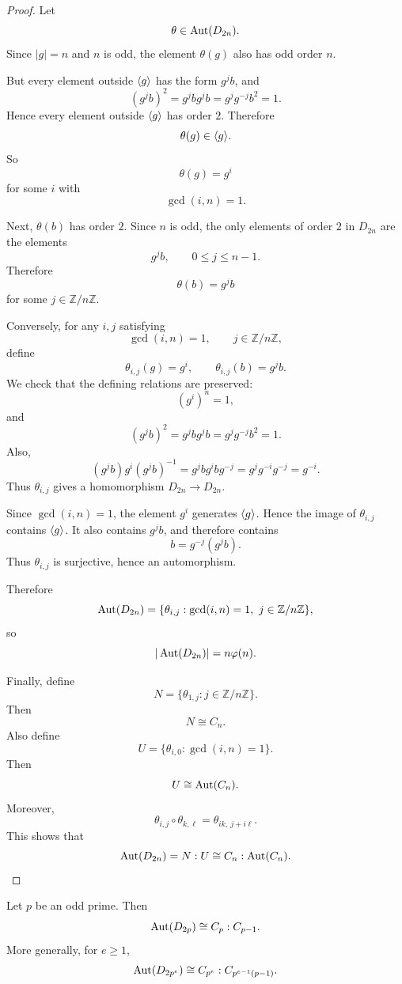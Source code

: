 \begin{proof}
Let
\[
    \theta\in\operatorname{Aut}(D_{2n}).
\]
Since $|g|=n$ and $n$ is odd, the element $\theta(g)$ also has odd order $n$.

But every element outside $\langle g\rangle$ has the form $g^j b$, and
\[
    (g^j b)^2
    =
    g^j b g^j b
    =
    g^j g^{-j}b^2
    =
    1.
\]
Hence every element outside $\langle g\rangle$ has order $2$. Therefore
\[
    \theta(g)\in\langle g\rangle.
\]
So
\[
    \theta(g)=g^i
\]
for some $i$ with
\[
    \gcd(i,n)=1.
\]

Next, $\theta(b)$ has order $2$. Since $n$ is odd, the only elements of order $2$ in $D_{2n}$ are the elements
\[
    g^j b,
    \qquad
    0\leq j\leq n-1.
\]
Therefore
\[
    \theta(b)=g^j b
\]
for some $j\in\mathbb Z/n\mathbb Z$.

Conversely, for any $i,j$ satisfying
\[
    \gcd(i,n)=1,
    \qquad
    j\in\mathbb Z/n\mathbb Z,
\]
define
\[
    \theta_{i,j}(g)=g^i,
    \qquad
    \theta_{i,j}(b)=g^j b.
\]
We check that the defining relations are preserved:
\[
    (g^i)^n=1,
\]
and
\[
    (g^j b)^2
    =
    g^j b g^j b
    =
    g^j g^{-j}b^2
    =
    1.
\]
Also,
\[
    (g^j b)g^i(g^j b)^{-1}
    =
    g^j b g^i b g^{-j}
    =
    g^j g^{-i}g^{-j}
    =
    g^{-i}.
\]
Thus $\theta_{i,j}$ gives a homomorphism $D_{2n}\to D_{2n}$.

Since $\gcd(i,n)=1$, the element $g^i$ generates $\langle g\rangle$. Hence the image of $\theta_{i,j}$ contains $\langle g\rangle$. It also contains $g^j b$, and therefore contains
\[
    b=g^{-j}(g^j b).
\]
Thus $\theta_{i,j}$ is surjective, hence an automorphism.

Therefore
\[
    \operatorname{Aut}(D_{2n})
    =
    \{\theta_{i,j}:\gcd(i,n)=1,\ j\in\mathbb Z/n\mathbb Z\},
\]
so
\[
    |\operatorname{Aut}(D_{2n})|
    =
    n\varphi(n).
\]

Finally, define
\[
    N=\{\theta_{1,j}:j\in\mathbb Z/n\mathbb Z\}.
\]
Then
\[
    N\cong C_n.
\]
Also define
\[
    U=\{\theta_{i,0}:\gcd(i,n)=1\}.
\]
Then
\[
    U\cong\operatorname{Aut}(C_n).
\]
Moreover,
\[
    \theta_{i,j}\circ\theta_{k,\ell}
    =
    \theta_{ik,\ j+i\ell}.
\]
This shows that
\[
    \operatorname{Aut}(D_{2n})
    =
    N:U
    \cong
    C_n:\operatorname{Aut}(C_n).
\]
\end{proof}

\begin{corollary}
Let $p$ be an odd prime. Then
\[
    \operatorname{Aut}(D_{2p})
    \cong
    C_p:C_{p-1}.
\]
More generally, for $e\geq 1$,
\[
    \operatorname{Aut}(D_{2p^e})
    \cong
    C_{p^e}:C_{p^{e-1}(p-1)}.
\]
\end{corollary}

